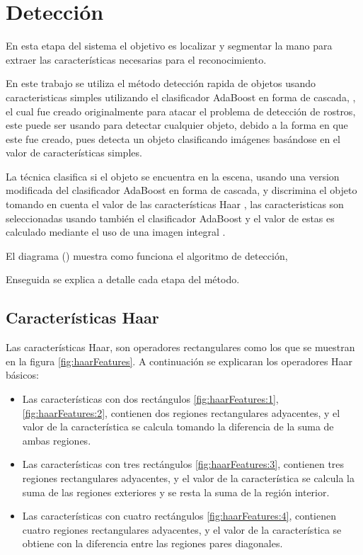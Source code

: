  
\section{Detección}\label{sec:ViolaJones}

En esta etapa del sistema el objetivo es localizar y segmentar la mano para extraer las características necesarias para el reconocimiento. 

En este trabajo se utiliza el método detección rapida de objetos usando caracteristicas simples utilizando el clasificador AdaBoost en forma de cascada, \citep{Viola2001}, el cual fue creado originalmente para atacar el problema de detección de rostros, este puede ser usando para detectar cualquier objeto, debido a la forma en que este fue creado, pues detecta un objeto clasificando imágenes basándose en el valor de características simples.

La técnica clasifica si el objeto se encuentra en la escena, usando una version modificada del clasificador AdaBoost \citep{Freund1995} en forma de cascada, y discrimina el objeto tomando en cuenta el valor de las características Haar \citep{Viola2001}, las caracteristicas son seleccionadas usando también el clasificador AdaBoost y el valor de estas es calculado mediante el uso de una imagen integral \citep{Viola2001}. 

El diagrama () muestra como funciona el algoritmo de detección, 

Enseguida se explica a detalle cada etapa del método. 

\subsection{Características Haar}\label{subsec:CaracteristicasHaar}  

Las características Haar, son operadores rectangulares como los que se muestran en la figura \ref{fig:haarFeatures}. A continuación se explicaran los operadores Haar básicos:
\begin{itemize}
\item Las características con dos rectángulos \ref{fig:haarFeatures:1}, \ref{fig:haarFeatures:2}, contienen dos regiones rectangulares adyacentes, y el valor de la característica se calcula tomando la diferencia de la suma de ambas regiones. 

\item Las características con tres rectángulos \ref{fig:haarFeatures:3}, contienen tres regiones rectangulares adyacentes, y el valor de la característica se calcula la suma de las regiones exteriores y se resta la suma de la región interior.

\item Las características con cuatro rectángulos \ref{fig:haarFeatures:4}, contienen cuatro regiones rectangulares adyacentes, y el valor de la característica se obtiene con la diferencia entre las regiones pares diagonales.
\end{itemize} 

